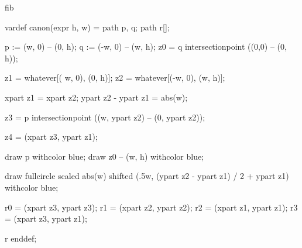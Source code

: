 

\startenvironment fib

	\startMPdefinitions
		vardef canon(expr h, w) =
			path p, q;
			path r[];

			p := (w,  0) -- (0, h); %
			q := (-w, 0) -- (w, h); %
			z0 = q intersectionpoint ((0,0) -- (0, h)); %

			z1 = whatever[( w, 0), (0, h)]; %
			z2 = whatever[(-w, 0), (w, h)]; %

			xpart z1 = xpart z2;
			ypart z2 - ypart z1 = abs(w);

			z3 = p intersectionpoint ((w, ypart z2) -- (0, ypart z2)); %

			z4 = (xpart z3, ypart z1); %

			draw p withcolor blue;
			draw z0 -- (w, h) withcolor blue;

			draw fullcircle scaled abs(w) shifted (.5w, (ypart z2 - ypart z1) / 2 + ypart z1) withcolor blue;



			r0 = (xpart z3, ypart z3); %
			r1 = (xpart z2, ypart z2); %
			r2 = (xpart z1, ypart z1); %
			r3 = (xpart z3, ypart z1); %

			r
		enddef;
	\stopMPdefinitions

\stopenvironment

